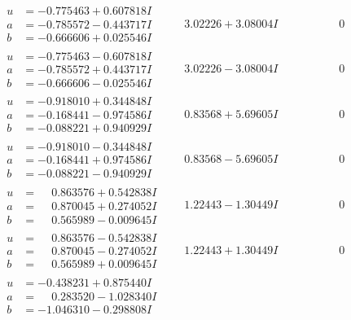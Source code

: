 \documentclass[1p]{elsarticle_modified}
\theoremstyle{definition}
\begin{document}
$$\begin{array}{c|c|c}
\begin{aligned}
u &= -0.775463 + 0.607818 I \\
a &= -0.785572 - 0.443717 I \\
b &= -0.666606 + 0.025546 I\end{aligned}
 & \phantom{-}3.02226 + 3.08004 I & \phantom{-0.000000 } 0 \\ \hline\begin{aligned}
u &= -0.775463 - 0.607818 I \\
a &= -0.785572 + 0.443717 I \\
b &= -0.666606 - 0.025546 I\end{aligned}
 & \phantom{-}3.02226 - 3.08004 I & \phantom{-0.000000 } 0 \\ \hline\begin{aligned}
u &= -0.918010 + 0.344848 I \\
a &= -0.168441 - 0.974586 I \\
b &= -0.088221 + 0.940929 I\end{aligned}
 & \phantom{-}0.83568 + 5.69605 I & \phantom{-0.000000 } 0 \\ \hline\begin{aligned}
u &= -0.918010 - 0.344848 I \\
a &= -0.168441 + 0.974586 I \\
b &= -0.088221 - 0.940929 I\end{aligned}
 & \phantom{-}0.83568 - 5.69605 I & \phantom{-0.000000 } 0 \\ \hline\begin{aligned}
u &= \phantom{-}0.863576 + 0.542838 I \\
a &= \phantom{-}0.870045 + 0.274052 I \\
b &= \phantom{-}0.565989 - 0.009645 I\end{aligned}
 & \phantom{-}1.22443 - 1.30449 I & \phantom{-0.000000 } 0 \\ \hline\begin{aligned}
u &= \phantom{-}0.863576 - 0.542838 I \\
a &= \phantom{-}0.870045 - 0.274052 I \\
b &= \phantom{-}0.565989 + 0.009645 I\end{aligned}
 & \phantom{-}1.22443 + 1.30449 I & \phantom{-0.000000 } 0 \\ \hline\begin{aligned}
u &= -0.438231 + 0.875440 I \\
a &= \phantom{-}0.283520 - 1.028340 I \\
b &= -1.046310 - 0.298808 I\end{aligned}

\end{array}$$
\end{document}
